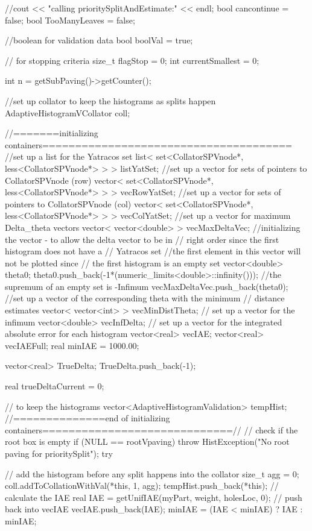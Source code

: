\begin{DoxyCode}
{
    //cout << "calling prioritySplitAndEstimate:" << endl;
   bool cancontinue = false;
   bool TooManyLeaves = false;
   
    //boolean for validation data
    bool boolVal = true;
    
    // for stopping criteria
    size_t flagStop = 0;
    int currentSmallest = 0;
    
    int n = getSubPaving()->getCounter();
    
    //set up collator to keep the histograms as splits happen
    AdaptiveHistogramVCollator coll;
    
   //=======initializing containers======================================
  //set up a list for the Yatracos set 
  list< set<CollatorSPVnode*, less<CollatorSPVnode*> > > listYatSet;
  //set up a vector for sets of pointers to CollatorSPVnode (row)
  vector< set<CollatorSPVnode*, less<CollatorSPVnode*> > > vecRowYatSet;
  //set up a vector for sets of pointers to CollatorSPVnode (col)
  vector< set<CollatorSPVnode*, less<CollatorSPVnode*> > > vecColYatSet;    
  //set up a vector for maximum Delta_theta vectors
  vector< vector<double> > vecMaxDeltaVec;
  //initializing the vector - to allow the delta vector to be in 
  // right order  since the first histogram does not have a 
  // Yatracos set
  //the first element in this vector will not be plotted since 
  // the first histogram is an empty set
  vector<double> theta0;
  theta0.push_back(-1*(numeric_limits<double>::infinity())); 
  //the supremum of an empty set is -Infimum 
  vecMaxDeltaVec.push_back(theta0);
  //set up a vector of the corresponding theta with the minimum 
  // distance estimates
  vector< vector<int> > vecMinDistTheta;
  // set up a vector for the infimum 
  vector<double> vecInfDelta;
  // set up a vector for the integrated absolute error for each histogram
   vector<real> vecIAE; 
   vector<real> vecIAEFull;
   real minIAE = 1000.00;
   
   vector<real> TrueDelta;
   TrueDelta.push_back(-1); 
   
   real trueDeltaCurrent = 0;
   
   // to keep the histograms
   vector<AdaptiveHistogramValidation> tempHist;
   //==============end of initializing
       containers=============================//   
   // check if the root box is empty
    if (NULL == rootVpaving) {
            throw HistException("No root paving for prioritySplit");
    }
    try {       
        // add the histogram before any split happens into the collator
        size_t agg = 0;
      coll.addToCollationWithVal(*this, 1, agg);
      tempHist.push_back(*this);
      // calculate the IAE 
      real IAE = getUnifIAE(myPart, weight, holesLoc, 0);
      // push back into vecIAE 
      vecIAE.push_back(IAE);
      minIAE = (IAE < minIAE) ? IAE : minIAE;
      
}}
\end{DoxyCode}
